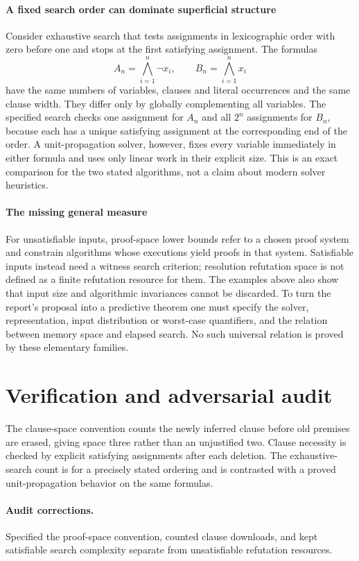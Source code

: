 \documentclass[11pt]{article}
\begin{document}
\paragraph{A fixed search order can dominate superficial structure}
Consider exhaustive search that tests assignments in lexicographic order with zero before one and stops at the first satisfying assignment. The formulas
\[
 A_n=\bigwedge_{i=1}^n\neg x_i,\qquad B_n=\bigwedge_{i=1}^n x_i
\]
have the same numbers of variables, clauses and literal occurrences and the same clause width. They differ only by globally complementing all variables. The specified search checks one assignment for $A_n$ and all $2^n$ assignments for $B_n$, because each has a unique satisfying assignment at the corresponding end of the order. A unit-propagation solver, however, fixes every variable immediately in either formula and uses only linear work in their explicit size. This is an exact comparison for the two stated algorithms, not a claim about modern solver heuristics.

\paragraph{The missing general measure}
For unsatisfiable inputs, proof-space lower bounds refer to a chosen proof system and constrain algorithms whose executions yield proofs in that system. Satisfiable inputs instead need a witness search criterion; resolution refutation space is not defined as a finite refutation resource for them. The examples above also show that input size and algorithmic invariances cannot be discarded. To turn the report's proposal into a predictive theorem one must specify the solver, representation, input distribution or worst-case quantifiers, and the relation between memory space and elapsed search. No such universal relation is proved by these elementary families.

\section{Verification and adversarial audit}
The clause-space convention counts the newly inferred clause before old premises are erased, giving space three rather than an unjustified two. Clause necessity is checked by explicit satisfying assignments after each deletion. The exhaustive-search count is for a precisely stated ordering and is contrasted with a proved unit-propagation behavior on the same formulas.
\paragraph{Audit corrections.} Specified the proof-space convention, counted clause downloads, and kept satisfiable search complexity separate from unsatisfiable refutation resources.
\end{document}
